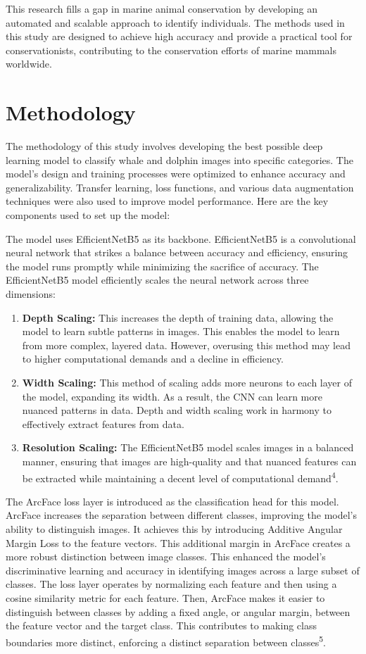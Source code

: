 \documentclass[twocolumn]{article}
\begin{document}
This research fills a gap in marine animal conservation by developing an automated and scalable approach to identify individuals. The methods used in this study are designed to achieve high accuracy and provide a practical tool for conservationists, contributing to the conservation efforts of marine mammals worldwide. 

\section{Methodology}
The methodology of this study involves developing the best possible deep learning model to classify whale and dolphin images into specific categories. The model’s design and training processes were optimized to enhance accuracy and generalizability. Transfer learning, loss functions, and various data augmentation techniques were also used to improve model performance. Here are the key components used to set up the model:

The model uses EfficientNetB5 as its backbone. EfficientNetB5 is a convolutional neural network that strikes a balance between accuracy and efficiency, ensuring the model runs promptly while minimizing the sacrifice of accuracy. The EfficientNetB5 model efficiently scales the neural network across three dimensions: 

\begin{enumerate}
    \item \textbf{Depth Scaling:} This increases the depth of training data, allowing the model to learn subtle patterns in images. This enables the model to learn from more complex, layered data. However, overusing this method may lead to higher computational demands and a decline in efficiency.
    \item \textbf{Width Scaling:} This method of scaling adds more neurons to each layer of the model, expanding its width. As a result, the CNN can learn more nuanced patterns in data. Depth and width scaling work in harmony to effectively extract features from data.
    \item \textbf{Resolution Scaling:} The EfficientNetB5 model scales images in a balanced manner, ensuring that images are high-quality and that nuanced features can be extracted while maintaining a decent level of computational demand\textsuperscript{4}.
\end{enumerate}

The ArcFace loss layer is introduced as the classification head for this model. ArcFace increases the separation between different classes, improving the model’s ability to distinguish images. It achieves this by introducing Additive Angular Margin Loss to the feature vectors. This additional margin in ArcFace creates a more robust distinction between image classes. This enhanced the model’s discriminative learning and accuracy in identifying images across a large subset of classes. The loss layer operates by normalizing each feature and then using a cosine similarity metric for each feature. Then, ArcFace makes it easier to distinguish between classes by adding a fixed angle, or angular margin, between the feature vector and the target class. This contributes to making class boundaries more distinct, enforcing a distinct separation between classes\textsuperscript{5}.
\end{document}
